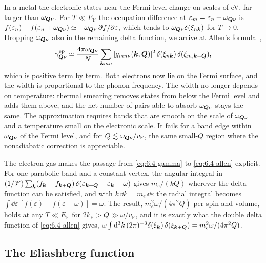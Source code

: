 In a metal the electronic states near the Fermi level change on scales of eV, far larger than $\omega_{\bm{Q}\nu}$. For $T \ll E_{\mathrm{F}}$ the occupation difference at $\varepsilon_m = \varepsilon_n + \omega_{\bm{Q}\nu}$ is $f(\varepsilon_n) - f(\varepsilon_n + \omega_{\bm{Q}\nu}) \simeq -\omega_{\bm{Q}\nu}\,\partial f/\partial\varepsilon$, which tends to $\omega_{\bm{Q}\nu}\delta(\xi_{n\bm{k}})$ for $T \to 0$. Dropping $\omega_{\bm{Q}\nu}$ also in the remaining delta function, we arrive at Allen's formula~\cite{allen1972neutron},
\begin{equation}
  \gamma^{\mathrm{ep}}_{\bm{Q}\nu} \simeq \frac{4\pi\omega_{\bm{Q}\nu}}{N}\sum_{\bm{k}mn}|g_{mn\nu}(\bm{k},\bm{Q})|^2\,\delta(\xi_{n\bm{k}})\,\delta(\xi_{m,\bm{k}+\bm{Q}}) ,
  \label{eq:6.4-allen}
\end{equation}
which is positive term by term. Both electrons now lie on the Fermi surface, and the width is proportional to the phonon frequency. The width no longer depends on temperature: thermal smearing removes states from below the Fermi level and adds them above, and the net number of pairs able to absorb $\omega_{\bm{Q}\nu}$ stays the same. The approximation requires bands that are smooth on the scale of $\omega_{\bm{Q}\nu}$ and a temperature small on the electronic scale. It fails for a band edge within $\omega_{\bm{Q}\nu}$ of the Fermi level, and for $Q \lesssim \omega_{\bm{Q}\nu}/v_{\mathrm{F}}$, the same small-$Q$ region where the nonadiabatic correction is appreciable.

The electron gas makes the passage from \cref{eq:6.4-gamma} to \cref{eq:6.4-allen} explicit. For one parabolic band and a constant vertex, the angular integral in $(1/\mathscr{V})\sum_{\bm{k}}(f_{\bm{k}} - f_{\bm{k}+\bm{Q}})\,\delta(\varepsilon_{\bm{k}+\bm{Q}} - \varepsilon_{\bm{k}} - \omega)$ gives $m_e/(kQ)$ wherever the delta function can be satisfied, and with $k\,\dd k = m_e\,\dd\varepsilon$ the radial integral becomes $\int\dd\varepsilon\,[f(\varepsilon) - f(\varepsilon + \omega)] = \omega$. The result, $m_e^2\omega/(4\pi^2Q)$ per spin and volume, holds at any $T \ll E_{\mathrm{F}}$ for $2k_{\mathrm{F}} > Q \gg \omega/v_{\mathrm{F}}$, and it is exactly what the double delta function of \cref{eq:6.4-allen} gives, $\omega\int\mathrm{d}^3k\,(2\pi)^{-3}\delta(\xi_{\bm{k}})\,\delta(\xi_{\bm{k}+\bm{Q}}) = m_e^2\omega/(4\pi^2Q)$.

\subsection{The Eliashberg function}

